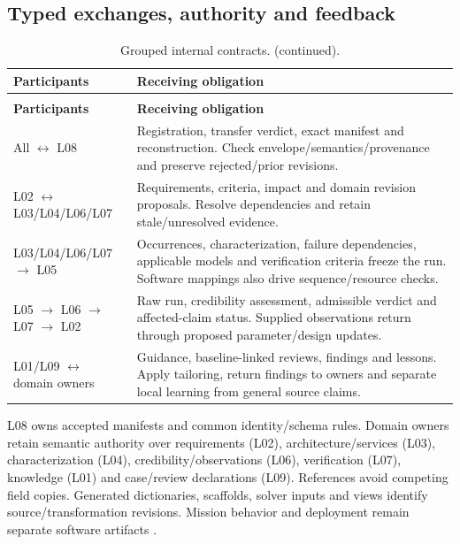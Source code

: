 \subsection{Typed exchanges, authority and feedback}
{\small
\setlength{\tabcolsep}{4pt}
\setlength{\parskip}{0pt}
\setlength{\LTpre}{0.4\baselineskip}
\setlength{\LTpost}{0.4\baselineskip}
\renewcommand{\arraystretch}{1.06}
\begin{longtable}{@{}>{\raggedright\arraybackslash}p{}>{\raggedright\arraybackslash}p{}@{}}
\caption{Grouped internal contracts.}\label{tab:framework-logical-exchanges}\\
\toprule
\textbf{Participants} & \textbf{Receiving obligation} \\
\midrule
\endfirsthead
\caption[]{Grouped internal contracts. (continued).}\\
\toprule
\textbf{Participants} & \textbf{Receiving obligation} \\
\midrule
\endhead
\bottomrule
\endfoot
All $\leftrightarrow$ L08 & Registration, transfer verdict, exact manifest and reconstruction. Check envelope/semantics/provenance and preserve rejected/prior revisions. \\
L02 $\leftrightarrow$ L03/L04/L06/L07 & Requirements, criteria, impact and domain revision proposals. Resolve dependencies and retain stale/unresolved evidence. \\
L03/L04/L06/L07 $\rightarrow$ L05 & Occurrences, characterization, failure dependencies, applicable models and verification criteria freeze the run. Software mappings also drive sequence/resource checks. \\
L05 $\rightarrow$ L06 $\rightarrow$ L07 $\rightarrow$ L02 & Raw run, credibility assessment, admissible verdict and affected-claim status. Supplied observations return through proposed parameter/design updates. \\
L01/L09 $\leftrightarrow$ domain owners & Guidance, baseline-linked reviews, findings and lessons. Apply tailoring, return findings to owners and separate local learning from general source claims. \\
\end{longtable}
}

L08 owns accepted manifests and common identity/schema rules. Domain owners retain semantic authority over requirements (L02), architecture/services (L03), characterization (L04), credibility/observations (L06), verification (L07), knowledge (L01) and case/review declarations (L09). References avoid competing field copies. Generated dictionaries, scaffolds, solver inputs and views identify source/transformation revisions. Mission behavior and deployment remain separate software artifacts \citep[Secs.~3--5]{review-0853}.

